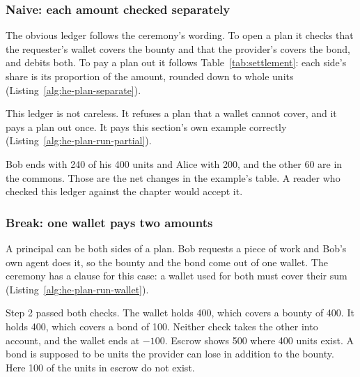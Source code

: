 \subsubsection{Naive: each amount checked separately}

The obvious ledger follows the ceremony's wording. To open a plan it
checks that the requester's wallet covers the bounty and that the
provider's covers the bond, and debits both. To pay a plan out it follows
Table~\ref{tab:settlement}: each side's share is its proportion of the
amount, rounded down to whole units (Listing~\ref{alg:he-plan-separate}).


This ledger is not careless. It refuses a plan that a wallet cannot cover,
and it pays a plan out once. It pays this section's own example correctly
(Listing~\ref{alg:he-plan-run-partial}).


Bob ends with 240 of his 400 units and Alice with 200, and the other 60 are
in the commons. Those are the net changes in the example's table. A reader
who checked this ledger against the chapter would accept it.

\subsubsection{Break: one wallet pays two amounts}

A principal can be both sides of a plan. Bob requests a piece of work and
Bob's own agent does it, so the bounty and the bond come out of one wallet.
The ceremony has a clause for this case: a wallet used for both must cover
their sum (Listing~\ref{alg:he-plan-run-wallet}).


Step 2 passed both checks. The wallet holds 400, which covers a bounty of
400. It holds 400, which covers a bond of 100. Neither check takes the
other into account, and the wallet ends at $-100$. Escrow shows 500 where
400 units exist. A bond is supposed to be units the provider can lose in
addition to the bounty. Here 100 of the units in escrow do not exist.

